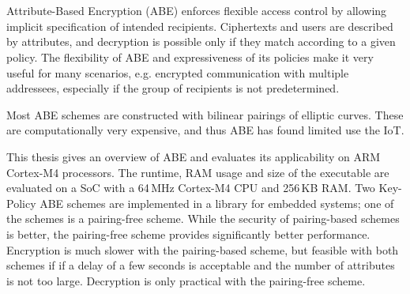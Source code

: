 \chapter{\abstractname}

Attribute-Based Encryption (ABE) enforces flexible access control by allowing implicit specification of intended recipients.
Ciphertexts and users are described by attributes, and decryption is possible only if they match according to a given policy.
The flexibility of ABE and expressiveness of its policies make it very useful for many scenarios, e.g. encrypted communication with multiple addressees, especially if the group of recipients is not predetermined.

Most ABE schemes are constructed with bilinear pairings of elliptic curves.
These are computationally very expensive, and thus ABE has found limited use the IoT.

This thesis gives an overview of ABE and evaluates its applicability on ARM Cortex-M4 processors.
The runtime, RAM usage and size of the executable are evaluated on a SoC with a 64\,MHz Cortex-M4 CPU and 256\,KB RAM.
Two Key-Policy ABE schemes are implemented in a library for embedded systems; one of the schemes is a pairing-free scheme.
While the security of pairing-based schemes is better, the pairing-free scheme provides significantly better performance.
Encryption is much slower with the pairing-based scheme, but feasible with both schemes if if a delay of a few seconds is acceptable and the number of attributes is not too large.
Decryption is only practical with the pairing-free scheme.